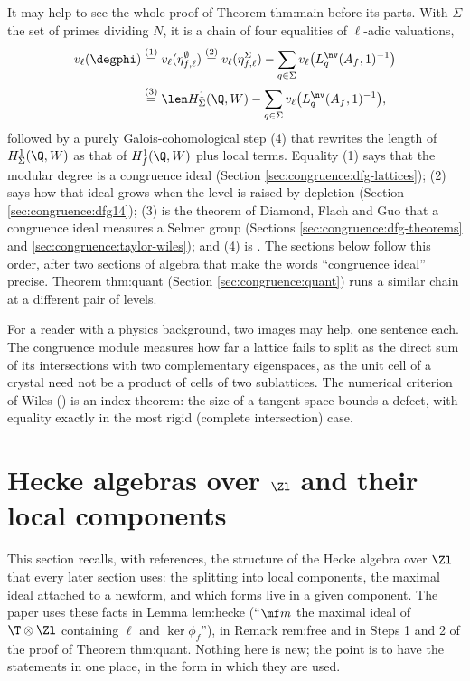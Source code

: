 It may help to see the whole proof of Theorem thm:main before its parts. With $\Sigma$ the set of primes dividing $N$, it is a chain of four equalities of $\ell$-adic valuations,
\begin{align*}
v_\ell(\degphi)&\overset{(1)}=v_\ell(\eta^\emptyset_{f,\ell})\overset{(2)}=v_\ell(\eta^\Sigma_{f,\ell})-\sum_{q\in\Sigma}v_\ell\bigl(L^{\nv}_q(A_f,1)^{-1}\bigr)\\
&\overset{(3)}=\len H^1_\Sigma(\Q,W)-\sum_{q\in\Sigma}v_\ell\bigl(L^{\nv}_q(A_f,1)^{-1}\bigr),
\end{align*}
followed by a purely Galois-cohomological step (4) that rewrites the length of $H^1_\Sigma(\Q,W)$ as that of $H^1_f(\Q,W)$ plus local terms. Equality (1) says that the modular degree is a congruence ideal (Section
\ref{sec:congruence:dfg-lattices}); (2) says how that ideal grows when the level is raised by depletion (Section \ref{sec:congruence:dfg14}); (3) is the theorem of Diamond, Flach and Guo that a congruence ideal
measures a Selmer group (Sections \ref{sec:congruence:dfg-theorems} and \ref{sec:congruence:taylor-wiles}); and (4) is . The sections below follow this order, after two sections of algebra that
make the words ``congruence ideal'' precise. Theorem thm:quant (Section \ref{sec:congruence:quant}) runs a similar chain at a different pair of levels.

For a reader with a physics background, two images may help, one sentence each. The congruence module measures how far a lattice fails to split as the
direct sum of its intersections with two complementary eigenspaces, as the unit cell of a crystal need not be a product of cells of two sublattices. The
numerical criterion of Wiles () is an index theorem: the size of a tangent space bounds a defect, with equality
exactly in the most rigid (complete intersection) case.

\section{Hecke algebras over $\Zl$ and their local components}\label{sec:congruence:hecke-local}

This section recalls, with references, the structure of the Hecke algebra over $\Zl$ that every later section uses: the splitting into local
components, the maximal ideal attached to a newform, and which forms live in a given component. The paper uses these facts in Lemma lem:hecke
(``$\mf m$ the maximal ideal of $\T\otimes\Zl$ containing $\ell$ and $\ker\phi_f$''), in Remark rem:free and in Steps 1 and 2 of the proof of Theorem thm:quant.
Nothing here is new; the point is to have the statements in one place, in the form in which they are used.

